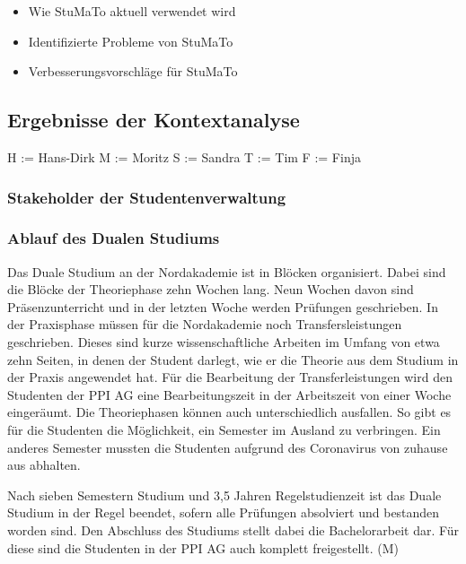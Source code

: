 \documentclass[
  12pt,
  ngerman,
  a4paper,
]{article}
\providecommand{\tightlist}{%
  \setlength{\itemsep}{0pt}\setlength{\parskip}{0pt}}
\begin{document}
\begin{itemize}
\tightlist
\item
  Wie StuMaTo aktuell verwendet wird
\item
  Identifizierte Probleme von StuMaTo
\item
  Verbesserungsvorschläge für StuMaTo
\end{itemize}

\hypertarget{ergebnisse-der-kontextanalyse}{%
\subsection{Ergebnisse der
Kontextanalyse}\label{ergebnisse-der-kontextanalyse}}

H := Hans-Dirk M := Moritz S := Sandra T := Tim F := Finja

\hypertarget{stakeholder-der-studentenverwaltung}{%
\subsubsection{Stakeholder der
Studentenverwaltung}\label{stakeholder-der-studentenverwaltung}}

\hypertarget{ablauf-des-dualen-studiums}{%
\subsubsection{Ablauf des Dualen
Studiums}\label{ablauf-des-dualen-studiums}}

Das Duale Studium an der Nordakademie ist in Blöcken organisiert. Dabei
sind die Blöcke der Theoriephase zehn Wochen lang. Neun Wochen davon
sind Präsenzunterricht und in der letzten Woche werden Prüfungen
geschrieben. In der Praxisphase müssen für die Nordakademie noch
Transfersleistungen geschrieben. Dieses sind kurze wissenschaftliche
Arbeiten im Umfang von etwa zehn Seiten, in denen der Student darlegt,
wie er die Theorie aus dem Studium in der Praxis angewendet hat. Für die
Bearbeitung der Transferleistungen wird den Studenten der PPI AG eine
Bearbeitungszeit in der Arbeitszeit von einer Woche eingeräumt. Die
Theoriephasen können auch unterschiedlich ausfallen. So gibt es für die
Studenten die Möglichkeit, ein Semester im Ausland zu verbringen. Ein
anderes Semester mussten die Studenten aufgrund des Coronavirus von
zuhause aus abhalten.

Nach sieben Semestern Studium und 3,5 Jahren Regelstudienzeit ist das
Duale Studium in der Regel beendet, sofern alle Prüfungen absolviert und
bestanden worden sind. Den Abschluss des Studiums stellt dabei die
Bachelorarbeit dar. Für diese sind die Studenten in der PPI AG auch
komplett freigestellt. (M)
\end{document}
